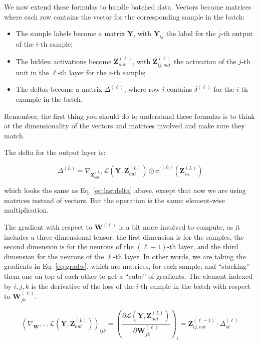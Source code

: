 \documentclass[
  a4paper,
]{article}
\providecommand{\tightlist}{%
  \setlength{\itemsep}{0pt}\setlength{\parskip}{0pt}}
\begin{document}
We now extend these formulas to handle batched data. Vectors become
matrices where each row contains the vector for the corresponding sample
in the batch:

\begin{itemize}
\tightlist
\item
  The sample labels become a matrix \(\textbf{Y}\), with
  \(\textbf{Y}_{ij}\) the label for the \(j\)-th output of the \(i\)-th
  sample;
\item
  The hidden activations become \(\textbf{Z}^{(\ell)}_{out}\), with
  \(\textbf{Z}^{(\ell)}_{ij,out}\) the activation of the \(j\)-th unit
  in the \(\ell\)-th layer for the \(i\)-th sample;
\item
  The deltas become a matrix \(\Delta^{(\ell)}\), where row \(i\)
  contains \(\delta^{(\ell)}\) for the \(i\)-th example in the batch.
\end{itemize}

Remember, the first thing you should do to understand these formulas is
to think at the dimensionality of the vectors and matrices involved and
make sure they match.

The delta for the output layer is:

\begin{equation}
\Delta^{(L)}
=\nabla_{\textbf{Z}^{(L)}_{out}}\mathcal{L}(\textbf{Y},\textbf{Z}^{(L)}_{out})
\odot{\sigma^\prime}^{(L)}(\textbf{Z}^{(L)}_{in})
\end{equation}

which looks the same as Eq. \ref{eq:lastdelta} above, except that now we
are using matrices instead of vectors. But the operation is the same:
element-wise multiplication.

The gradient with respect to \(\textbf{W}^{(\ell)}\) is a bit more
involved to compute, as it includes a three-dimensional tensor: the
first dimension is for the samples, the second dimension is for the
neurons of the \((\ell-1)\)-th layer, and the third dimension for the
neurons of the \(\ell\)-th layer. In other words, we are taking the
gradients in Eq. \ref{eq:gradw}, which are matrices, for each sample,
and ``stacking'' them one on top of each other to get a ``cube'' of
gradients. The element indexed by \(i,j,k\) is the derivative of the
loss of the \(i\)-th sample in the batch with respect to
\(\textbf{W}^{(\ell)}_{jk}\).

\begin{equation}
\left(\nabla_{\textbf{W}^{(\ell)}}\mathcal{L}(\textbf{Y},\textbf{Z}^{(L)}_{out})\right)_{ijk}
=\left(
  \frac{\partial \mathcal{L}(\textbf{Y},\textbf{Z}^{(L)}_{out})}{\partial \textbf{W}^{(\ell)}_{jk}}
\right)_i
=\textbf{Z}^{(\ell-1)}_{ij,out}\cdot\Delta^{(\ell)}_{ik}
\end{equation}
\end{document}
